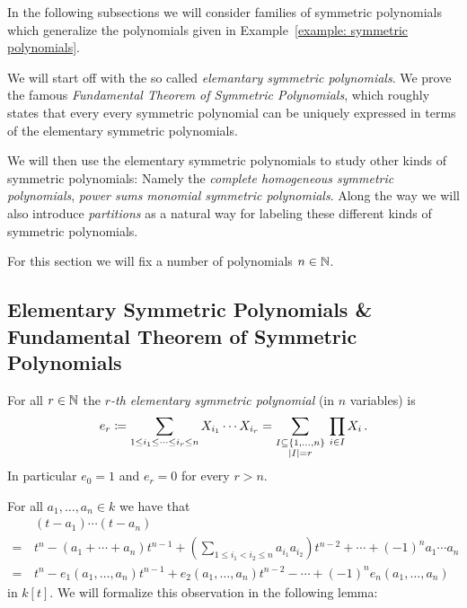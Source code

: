 \begin{fluff}
  In the following subsections we will consider families of symmetric polynomials which generalize the polynomials given in Example~\ref{example: symmetric polynomials}.
  
  We will start off with the so called \emph{elemantary symmetric polynomials}.
  We prove the famous \emph{Fundamental Theorem of Symmetric Polynomials}, which roughly states that every every symmetric polynomial can be uniquely expressed in terms of the elementary symmetric polynomials.
  
  We will then use the elementary symmetric polynomials to study other kinds of symmetric polynomials:
  Namely the \emph{complete homogeneous symmetric polynomials}, \emph{power sums} \emph{monomial symmetric polynomials}.
  Along the way we will also introduce \emph{partitions} as a natural way for labeling these different kinds of symmetric polynomials.
\end{fluff}


\begin{notation}
  For this section we will fix a number of polynomials $n \in \mathbb{N}$.
\end{notation}





\subsection{Elementary Symmetric Polynomials \& Fundamental Theorem of Symmetric Polynomials}


\begin{definition}
  For all $r \in \mathbb{N}$ the \emph{$r$-th elementary symmetric polynomial} (in $n$ variables) is
  \[
              e_r
    \coloneqq  \sum_{1 \leq i_1 \leq \dotsb \leq i_r \leq n} X_{i_1} \dotsm X_{i_r}
    =         \sum_{\substack{I \subseteq \{1, \dotsc, n\} \\ |I| = r}} \, \prod_{i \in I} X_i \,.
  \]
  In particular $e_0 = 1$ and $e_r = 0$ for every $r > n$.
\end{definition}


\begin{fluff}
  For all $a_1, \dotsc, a_n \in k$ we have that
  \begin{align*}
     &\, (t-a_1) \dotsm (t-a_n) \\
    =&\, t^n  - (a_1 + \dotsb + a_n) t^{n-1}
              + \left( \sum_{1 \leq i_1 < i_2 \leq n} a_{i_1} a_{i_2} \right) t^{n-2}
              + \dotsb
              + (-1)^n a_1 \dotsm a_n \\ 
    =&\,    t^n
          - e_1(a_1, \dotsc, a_n) t^{n-1}
          + e_2(a_1, \dotsc, a_n) t^{n-2}
          - \dotsb
          + (-1)^n e_n(a_1, \dotsc, a_n)
  \end{align*}
  in $k[t]$.
  We will formalize this observation in the following lemma:
\end{fluff}


